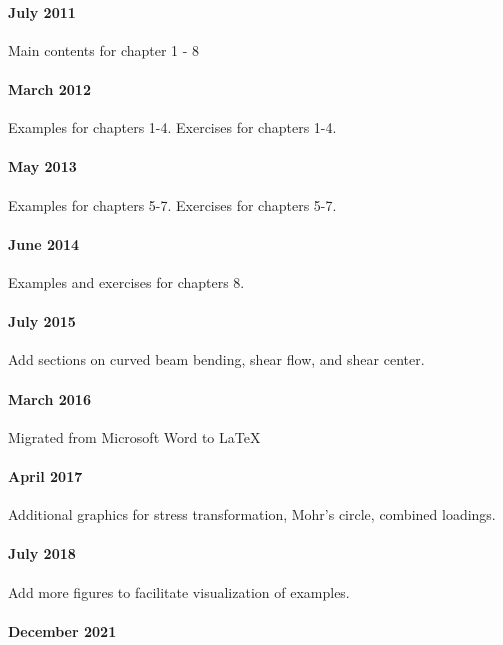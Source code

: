 \documentclass[
10pt,
a4paper,
openany,
svgnames,
]{kaobook} %
\begin{document}
\paragraph{July 2011}

Main contents for chapter 1 - 8

\paragraph{March 2012}

Examples for chapters 1-4. Exercises for chapters 1-4.

\paragraph{May 2013}

Examples for chapters 5-7. Exercises for chapters 5-7.

\paragraph{June 2014}

Examples and exercises for chapters 8.

\paragraph{July 2015}

Add sections on curved beam bending, shear flow, and shear center.

\paragraph{March 2016}

Migrated from Microsoft Word to \LaTeX\

\paragraph{April 2017}

Additional graphics for stress transformation, Mohr's circle, combined loadings.

\paragraph{July 2018}

Add more figures to facilitate visualization of examples.

\paragraph{December 2021}
\end{document}
